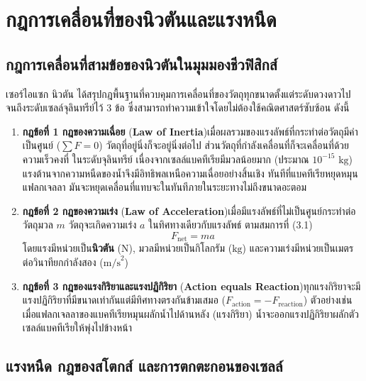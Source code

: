\chapter{กฎการเคลื่อนที่ของนิวตันและแรงหนืด}

\section{กฎการเคลื่อนที่สามข้อของนิวตันในมุมมองชีวฟิสิกส์}

เซอร์ไอแซก นิวตัน ได้สรุปกฎพื้นฐานที่ควบคุมการเคลื่อนที่ของวัตถุทุกขนาดตั้งแต่ระดับดวงดาวไปจนถึงระดับเซลล์จุลินทรีย์ไว้ 3 ข้อ ซึ่งสามารถทำความเข้าใจโดยไม่ต้องใช้คณิตศาสตร์ซับซ้อน ดังนี้

\begin{enumerate}
    \item \textbf{กฎข้อที่ 1 กฎของความเฉื่อย} (\textbf{Law of Inertia})\quad เมื่อผลรวมของแรงลัพธ์ที่กระทำต่อวัตถุมีค่าเป็นศูนย์ ($\sum F = 0$) วัตถุที่อยู่นิ่งก็จะอยู่นิ่งต่อไป ส่วนวัตถุที่กำลังเคลื่อนที่ก็จะเคลื่อนที่ด้วยความเร็วคงที่ ในระดับจุลินทรีย์ เนื่องจากเซลล์แบคทีเรียมีมวลน้อยมาก (ประมาณ $10^{-15}\text{ kg}$) แรงต้านจากความหนืดของน้ำจึงมีอิทธิพลเหนือความเฉื่อยอย่างสิ้นเชิง ทันทีที่แบคทีเรียหยุดหมุนแฟลกเจลลา มันจะหยุดเคลื่อนที่แทบจะในทันทีภายในระยะทางไม่ถึงขนาดอะตอม
    \item \textbf{กฎข้อที่ 2 กฎของความเร่ง} (\textbf{Law of Acceleration})\quad เมื่อมีแรงลัพธ์ที่ไม่เป็นศูนย์กระทำต่อวัตถุมวล $m$ วัตถุจะเกิดความเร่ง $a$ ในทิศทางเดียวกับแรงลัพธ์ ตามสมการที่ (3.1)
    \begin{equation}
        F_{\text{net}} = m a
    \end{equation}
    โดยแรงมีหน่วยเป็น\textbf{นิวตัน} ($\text{N}$), มวลมีหน่วยเป็นกิโลกรัม ($\text{kg}$) และความเร่งมีหน่วยเป็นเมตรต่อวินาทียกกำลังสอง ($\text{m/s}^2$)
    \item \textbf{กฎข้อที่ 3 กฎของแรงกิริยาและแรงปฏิกิริยา} (\textbf{Action equals Reaction})\quad ทุกแรงกิริยาจะมีแรงปฏิกิริยาที่มีขนาดเท่ากันแต่มีทิศทางตรงกันข้ามเสมอ ($F_{\text{action}} = -F_{\text{reaction}}$) ตัวอย่างเช่น เมื่อแฟลกเจลลาของแบคทีเรียหมุนผลักน้ำไปด้านหลัง (แรงกิริยา) น้ำจะออกแรงปฏิกิริยาผลักตัวเซลล์แบคทีเรียให้พุ่งไปข้างหน้า
\end{enumerate}

\section{แรงหนืด กฎของสโตกส์ และการตกตะกอนของเซลล์}

